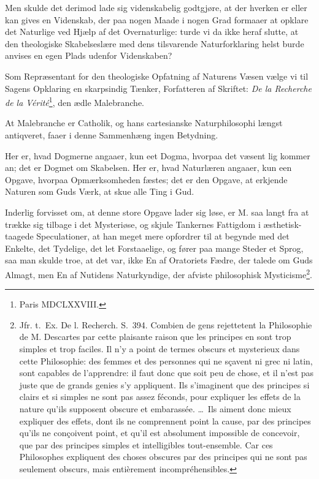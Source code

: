 \documentclass[12pt,a4paper]{article}
\newcommand{\opage}[1]{\marginnote{\footnotesize\textit{[#1]}}}
\begin{document}
Men skulde det derimod lade sig videnskabelig godtgjøre, at der hverken
er eller kan gives en Videnskab, der paa nogen Maade i nogen Grad
formaaer at opklare det Naturlige ved Hjælp af det Overnaturlige: turde vi da
ikke heraf slutte, at den theologiske Skabelseslære med dens tilsvarende
Naturforklaring helst burde anvises en egen Plads udenfor Videnskaben?

Som Repræsentant for den theologiske Opfatning af Naturens Væsen
vælge vi til Sagens Opklaring en skarpsindig Tænker, Forfatteren af Skriftet:
\emph{De la Recherche de la Vérité}\footnote{Paris MDCLXXVIII.}, den ædle
Malebranche.

At Malebranche er Catholik, og hans cartesianske Naturphilosophi længst
antiqveret, faaer i denne Sammenhæng ingen Betydning.

Her er, hvad Dogmerne angaaer, kun eet Dogma, hvorpaa det væsent%
\opage{6}lig kommer an; det er Dogmet om Skabelsen. Her er, hvad Naturlæren
angaaer, kun een Opgave, hvorpaa Opmærksomheden fæstes; det er den
Opgave, at erkjende Naturen som Guds Værk, at skue alle Ting i Gud.

Inderlig forvisset om, at denne store Opgave lader sig løse, er M.
saa langt fra at trække sig tilbage i det Mysteriøse, og skjule Tankernes
Fattigdom i æsthetisk-taagede Speculationer, at han meget mere opfordrer til at
begynde med det Enkelte, det Tydelige, det let Forstaaelige, og fører paa
mange Steder et Sprog, saa man skulde troe, at det var, ikke En af
Oratoriets Fædre, der talede om Guds Almagt, men En af Nutidens
Naturkyndige, der afviste philosophisk Mysticisme\footnote{Jfr. t.~Ex. De l.
Recherch. S.~394. Combien de gens rejettetent la Philosophie de M. Descartes
par cette plaisante raison que les principes en sont trop simples et trop
faciles. Il n'y a point de termes obscurs et mysterieux dans cette Philosophie:
des femmes et des personnes qui ne sçavent ni grec ni latin, sont capables de
l'apprendre: il faut donc que soit peu de chose, et il n'est pas juste que de
grands genies s'y appliquent. Ils s'imaginent que des principes si clairs et si
simples ne sont pas assez féconds, pour expliquer les effets de la nature qu'ils
supposent obscure et embarassée. \dots\ Ils aiment donc mieux expliquer des
effets, dont ils ne comprennent point la cause, par des principes qu'ils ne
conçoivent point, et qu'il est absolument impossible de concevoir, que par des
principes simples et intelligibles tout-ensemble. Car ces Philosophes expliquent
des choses obscures par des principes qui ne sont pas seulement obscurs, mais
entièrement incompréhensibles.}.
\end{document}
